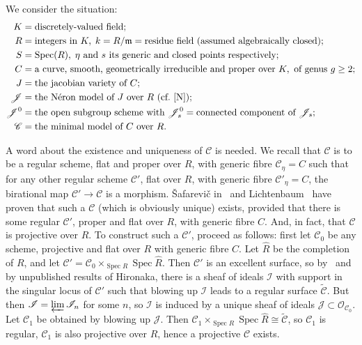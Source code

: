 \documentclass[10pt]{amsart}
\theoremstyle{plain}
\theoremstyle{definition}
\DeclareMathOperator{\Spec}{Spec}
\newcommand{\cO}{\mathcal{O}}
\newcommand{\m}{\mathfrak{m}}
\begin{document}
We consider the situation:
\begin{align*}
K &= \text{discretely-valued field;} \\
R &= \text{integers in } K, \; k = R/\m = \text{residue field (assumed algebraically closed);} \\
S &= \Spec(R), \; \eta \text{ and } s \text{ its generic and closed points respectively;} \\
C &= \text{a curve, smooth, geometrically irreducible and proper over } K, \text{ of genus } g \geq 2; \\
J &= \text{the jacobian variety of } C; \\
\mathscr{J} &= \text{the N\'eron model of } J \text{ over } R \text{ (cf.~\cite{N});} \\
\mathscr{J}^0 &= \text{the open subgroup scheme with } \mathscr{J}^0_s = \text{connected component of } \mathscr{J}_s; \\
\mathscr{C} &= \text{the minimal model of } C \text{ over } R.
\end{align*}

A word about the existence and uniqueness of $\mathscr{C}$ is needed. We recall that $\mathscr{C}$ is to be a regular scheme, flat and proper over $R$, with generic fibre $\mathscr{C}_\eta = C$ such that for any other regular scheme $\mathscr{C}'$, flat over $R$, with generic fibre $\mathscr{C}'_\eta = C$, the birational map $\mathscr{C}' \to \mathscr{C}$ is a morphism. \v{S}afarevi\v{c} in~\cite{Saf} and Lichtenbaum~\cite{L} have proven that such a $\mathscr{C}$ (which is obviously unique) exists, provided that there is some regular $\mathscr{C}'$, proper and flat over $R$, with generic fibre $C$. And, in fact, that $\mathscr{C}$ is projective over $R$. To construct such a $\mathscr{C}'$, proceed as follows: first let $\mathscr{C}_0$ be any scheme, projective and flat over $R$ with generic fibre $C$. Let $\widehat{R}$ be the completion of $R$, and let $\mathscr{C}' = \mathscr{C}_0 \times_{\Spec R} \Spec \widehat{R}$. Then $\mathscr{C}'$ is an excellent surface, so by~\cite{Ab} and by unpublished results of Hironaka, there is a sheaf of ideals $\mathscr{I}$ with support in the singular locus of $\mathscr{C}'$ such that blowing up $\mathscr{I}$ leads to a regular surface $\widetilde{\mathscr{C}}$. But then $\mathscr{I} = \varprojlim \mathscr{I}_n$ for some $n$, so $\mathscr{I}$ is induced by a unique sheaf of ideals $\mathscr{J} \subset \cO_{\mathscr{C}_0}$. Let $\mathscr{C}_1$ be obtained by blowing up $\mathscr{J}$. Then $\mathscr{C}_1 \times_{\Spec R} \Spec \widehat{R} \cong \widetilde{\mathscr{C}}$, so $\mathscr{C}_1$ is regular, $\mathscr{C}_1$ is also projective over $R$, hence a projective $\mathscr{C}$ exists.
\end{document}
